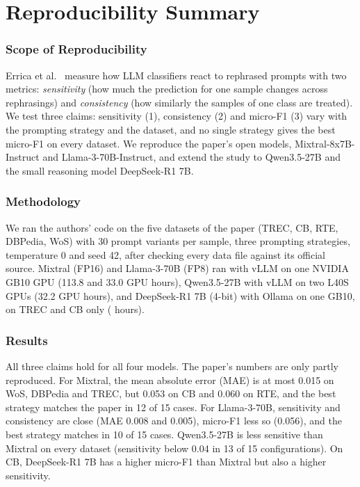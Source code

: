 \section*{\centering Reproducibility Summary}

\subsubsection*{Scope of Reproducibility}

Errica et al.~\cite{Errica:2025} measure how LLM classifiers react to
rephrased prompts with two metrics: \emph{sensitivity} (how much the
prediction for one sample changes across rephrasings) and \emph{consistency}
(how similarly the samples of one class are treated). We test three claims:
sensitivity (1), consistency (2) and micro-F1 (3) vary with the prompting
strategy and the dataset, and no single strategy gives the best micro-F1 on
every dataset. We reproduce the paper's open models, Mixtral-8x7B-Instruct
and Llama-3-70B-Instruct, and extend the study to Qwen3.5-27B and the small
reasoning model DeepSeek-R1 7B.

\subsubsection*{Methodology}

We ran the authors' code on the five datasets of the paper (TREC, CB, RTE,
DBPedia, WoS) with 30 prompt variants per sample, three prompting strategies,
temperature 0 and seed 42, after checking every data file against its official
source. Mixtral (FP16) and Llama-3-70B (FP8) ran with vLLM on one NVIDIA GB10
GPU (113.8 and 33.0 GPU hours), Qwen3.5-27B with vLLM on two L40S GPUs (32.2
GPU hours), and DeepSeek-R1 7B (4-bit) with Ollama on one GB10, on TREC and CB
only (\tbd{} hours).

\subsubsection*{Results}

All three claims hold for all four models. The paper's numbers are only partly
reproduced. For Mixtral, the mean absolute error (MAE) is at most 0.015 on
WoS, DBPedia and TREC, but 0.053 on CB and 0.060 on RTE, and the best strategy
matches the paper in 12 of 15 cases. For Llama-3-70B, sensitivity and
consistency are close (MAE 0.008 and 0.005), micro-F1 less so (0.056), and the
best strategy matches in 10 of 15 cases. Qwen3.5-27B is less sensitive than
Mixtral on every dataset (sensitivity below 0.04 in 13 of 15 configurations).
On CB, DeepSeek-R1 7B has a higher micro-F1 than Mixtral but also a higher
sensitivity.

